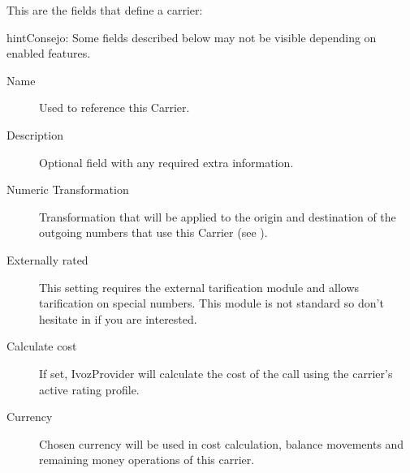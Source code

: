 \documentclass[letterpaper,10pt,spanish]{sphinxmanual}
\begin{document}
This are the fields that define a carrier:

\begin{notice}{hint}{Consejo:}
Some fields described below may not be visible depending on enabled features.
\end{notice}
\begin{description}
\item[{Name}] \leavevmode{}\label{administration_portal/brand/providers/carriers:term-name}
Used to reference this Carrier.

\item[{Description}] \leavevmode{}\label{administration_portal/brand/providers/carriers:term-description}
Optional field with any required extra information.

\item[{Numeric Transformation}] \leavevmode{}\label{administration_portal/brand/providers/carriers:term-numeric-transformation}
Transformation that will be applied to the origin and destination of the
outgoing numbers that use this Carrier
(see {\hyperref[administration_portal/brand/settings/numeric_transformations:numeric\string-transformations]{}}).

\item[{Externally rated}] \leavevmode{}\label{administration_portal/brand/providers/carriers:term-externally-rated}
This setting requires the external tarification module and allows
tarification on special numbers. This module is not standard so don't
hesitate in {\hyperref[basic_concepts/intro/getting_help:getting\string-help]{}} if you are interested.

\item[{Calculate cost}] \leavevmode{}\label{administration_portal/brand/providers/carriers:term-calculate-cost}
If set, IvozProvider will calculate the cost of the call using the carrier's active rating profile.

\item[{Currency}] \leavevmode{}\label{administration_portal/brand/providers/carriers:term-currency}
Chosen currency will be used in cost calculation, balance movements and
remaining money operations of this carrier.


\end{description}
\end{document}
